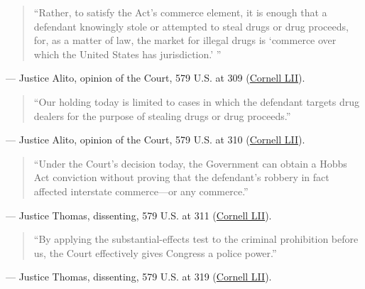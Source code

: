 \documentclass[12pt]{article}
\begin{document}
\begin{quote}
``Rather, to satisfy the Act's commerce element, it is enough that a defendant knowingly stole or attempted to steal drugs or drug proceeds, for, as a matter of law, the market for illegal drugs is `commerce over which the United States has jurisdiction.' ''
\end{quote}
\noindent--- Justice Alito, opinion of the Court, 579 U.S. at 309 (\href{https://www.law.cornell.edu/supremecourt/text/14-6166}{Cornell LII}).

\begin{quote}
``Our holding today is limited to cases in which the defendant targets drug dealers for the purpose of stealing drugs or drug proceeds.''
\end{quote}
\noindent--- Justice Alito, opinion of the Court, 579 U.S. at 310 (\href{https://www.law.cornell.edu/supremecourt/text/14-6166}{Cornell LII}).

\begin{quote}
``Under the Court's decision today, the Government can obtain a Hobbs Act conviction without proving that the defendant's robbery in fact affected interstate commerce---or any commerce.''
\end{quote}
\noindent--- Justice Thomas, dissenting, 579 U.S. at 311 (\href{https://www.law.cornell.edu/supremecourt/text/14-6166}{Cornell LII}).

\begin{quote}
``By applying the substantial-effects test to the criminal prohibition before us, the Court effectively gives Congress a police power.''
\end{quote}
\noindent--- Justice Thomas, dissenting, 579 U.S. at 319 (\href{https://www.law.cornell.edu/supremecourt/text/14-6166}{Cornell LII}).
\end{document}
